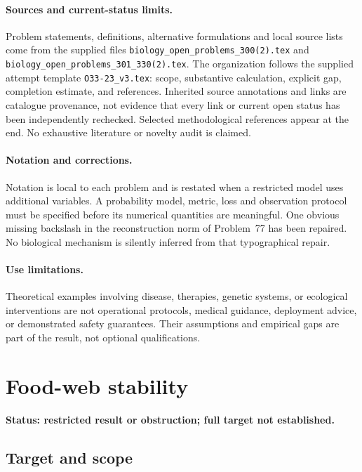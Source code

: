 \documentclass[11pt]{article}
\begin{document}
\paragraph{Sources and current-status limits.}
Problem statements, definitions, alternative formulations and local source lists
come from the supplied files
\texttt{biology\_open\_problems\_300(2).tex} and
\texttt{biology\_open\_problems\_301\_330(2).tex}.
The organization follows the supplied attempt template
\texttt{O33-23\_v3.tex}: scope, substantive calculation, explicit gap,
completion estimate, and references. Inherited source annotations and links are
catalogue provenance, not evidence that every link or current open status has
been independently rechecked. Selected methodological references appear at the
end. No exhaustive literature or novelty audit is claimed.

\paragraph{Notation and corrections.}
Notation is local to each problem and is restated when a restricted model uses
additional variables. A probability model, metric, loss and observation protocol
must be specified before its numerical quantities are meaningful. One obvious
missing backslash in the reconstruction norm of Problem~77 has been repaired.
No biological mechanism is silently inferred from that typographical repair.

\paragraph{Use limitations.}
Theoretical examples involving disease, therapies, genetic systems, or ecological
interventions are not operational protocols, medical guidance, deployment advice,
or demonstrated safety guarantees. Their assumptions and empirical gaps are part
of the result, not optional qualifications.


\section*{Food-web stability}
\label{prob:194}
\noindent\textbf{Status: restricted result or obstruction; full target not established.}
\subsection{Target and scope}
\end{document}
